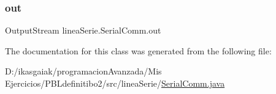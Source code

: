 \mbox{\label{classlinea_serie_1_1_serial_comm_a26da908a9338f21051edcee4fb86a3ad}} 
\subsubsection{\texorpdfstring{out}{out}}
{\footnotesize\ttfamily Output\+Stream linea\+Serie.\+Serial\+Comm.\+out}



The documentation for this class was generated from the following file\+:\begin{DoxyCompactItemize}
\item 
D\+:/ikasgaiak/programacion\+Avanzada/\+Mis Ejercicios/\+P\+B\+Ldefinitibo2/src/linea\+Serie/\mbox{\hyperlink{_serial_comm_8java}{Serial\+Comm.\+java}}\end{DoxyCompactItemize}
